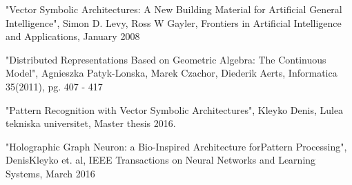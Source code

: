 \begin{thebibliography}{9}
		"Vector Symbolic Architectures: A New Building Material for Artificial General Intelligence", Simon D. Levy, Ross W Gayler, Frontiers in Artificial Intelligence and Applications, January 2008
		
		"Distributed Representations Based on Geometric Algebra: The Continuous Model", Agnieszka Patyk-Lonska, Marek Czachor, Diederik Aerts, Informatica 35(2011), pg. 407 - 417 
		
	"Pattern Recognition with Vector Symbolic Architectures", Kleyko Denis, Lulea tekniska universitet, Master thesis 2016.
	
	"Holographic Graph Neuron: a Bio-Inspired Architecture forPattern Processing", DenisKleyko et. al, IEEE Transactions on Neural Networks and Learning Systems, March 2016
\end{thebibliography}